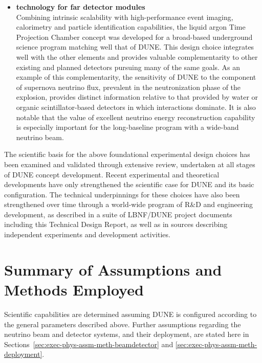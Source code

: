 \begin{itemize}
  \item {\bf \lartpc technology for far detector modules}\\
    Combining intrinsic scalability with high-performance event 
    imaging, calorimetry and particle identification capabilities, 
    the liquid argon Time Projection Chamber concept was developed 
    for a broad-based underground science program matching well 
    that of DUNE.  This design choice integrates well with the
    other elements and provides valuable complementarity to other 
    existing and planned detectors pursuing many
    of the same goals.  As an example of this complementarity,
    the sensitivity of DUNE to the \nue component of supernova 
    neutrino flux, prevalent in the neutronization phase of the 
    explosion, provides distinct information relative to that 
    provided by water or organic scintillator-based detectors in 
    which \anue interactions dominate.  It is also notable that 
    the value of excellent neutrino energy reconstruction capability
    is especially important for the long-baseline program with a 
    wide-band neutrino beam.
\end{itemize}

The scientific basis for the above foundational experimental
design choices has been examined and validated through extensive
review, undertaken at all stages of DUNE concept development.
Recent experimental and theoretical developments have only
strengthened the scientific case for DUNE and its
basic configuration.  The technical underpinnings for
these choices have also been strengthened over time through a world-wide
program of R\&D and engineering development, as described in a suite
of LBNF/DUNE project documents including this Technical Design Report, as
well as in sources describing independent experiments and development
activities.

\section{Summary of Assumptions and Methods Employed}
\label{sec:exec-phys-assm-meth}

Scientific capabilities are determined assuming DUNE
is configured according to the general parameters described above.
Further assumptions regarding the neutrino beam and detector 
systems, and their deployment, are stated here in
Sections~\ref{sec:exec-phys-assm-meth-beamdetector} and
\ref{sec:exec-phys-assm-meth-deployment}. 

